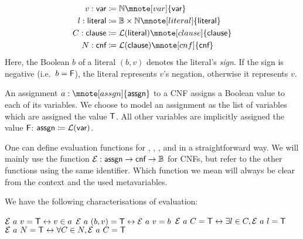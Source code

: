 \newcommand*{\bvar}{\textsf{var}}
\newcommand*{\literal}{\textsf{literal}}
\newcommand*{\clause}{\textsf{clause}}
\newcommand*{\cnf}{\textsf{cnf}}
\newcommand*{\assgn}{\textsf{assgn}}
\newcommand*{\eval}{\mathcal{E}}
\newcommand*{\evalA}[2]{\eval~#1~#2}
\begin{align*}
  v : \bvar &\defeq \nat \mnote[var]{\bvar}\\
  l : \literal &\defeq \bool \times \nat \mnote[literal]{\literal}\\
  C : \clause &\defeq \listsof{\literal} \mnote[clause]{\clause}\\
  N : \cnf &\defeq \listsof{\clause} \mnote[cnf]{\cnf}
\end{align*}
Here, the Boolean $b$ of a literal $(b, v)$ denotes the literal's \textit{sign}. If the sign is negative (i.e.\ $b = \mathsf{F}$), the literal represents $v$'s negation, otherwise it represents $v$.

An assignment $a : \mnote[assgn]{\assgn}$ to a CNF assigns a Boolean value to each of its variables. We choose to model an assignment as the list of variables which are assigned the value $\mathsf{T}$. All other variables are implicitly assigned the value $\mathsf{F}$: $\assgn \defeq \listsof{\bvar}$.

One can define evaluation functions \mnotec{$\eval$} for ,
, , and  in a straightforward way. 
We will mainly use the function $\eval : \assgn \rightarrow \cnf \rightarrow \bool$ for CNFs, but refer to the other functions using the same identifier. 
Which function we mean will always be clear from the context and the used metavariables. 

We have the following characterisations of evaluation:
\begin{lemma}\label{lem:cnf_eval_equiv}\leavevmode
  \begin{enumerate}
     $\evalA{a}{v} = \btrue \leftrightarrow v \in a$ 
     $\evalA{a}{(b, v)} = \btrue \leftrightarrow \evalA{a}{v} = b$
     $\evalA{a}{C} = \btrue \leftrightarrow \exists l \in C, \evalA{a}{l} = \btrue$
     $\evalA{a}{N} = \btrue \leftrightarrow \forall C \in N, \evalA{a}{C} = \btrue$
  \end{enumerate}
\end{lemma}

